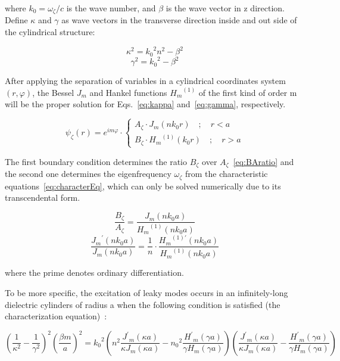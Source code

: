 where $k_0=\omega_\zeta/c$ is the wave number, and $\beta$ is the wave vector
in z direction. Define $\kappa$ and $\gamma$ as wave vectors in the transverse
direction inside and out side of the cylindrical structure:

\begin{equation}
  \kappa^2={k_0}^2n^2-\beta^2
  \label{eq:kappa}
\end{equation}
\begin{equation}
  \gamma^2={k_0}^2-\beta^2
  \label{eq:gamma}
\end{equation}

After applying the separation of variables in a cylindrical coordinates system
$(r,\varphi)$, the Bessel $J_m$ and Hankel functions ${H_m}^{(1)}$ of the first
kind of order m will be the proper solution for Eqs.~\ref{eq:kappa}
and~\ref{eq:gamma}, respectively.

\begin{equation}
  \psi_\zeta(r)=e^{im\varphi}\cdot\left\{
    \begin{array}{ll}
      A_\zeta\cdot{J_m}(nk_0r)\quad;\quad r<a\\
      B_\zeta\cdot{H_m}^{(1)}(k_0r)\quad;\quad r>a
    \end{array}
    \right.
\end{equation}

The first boundary condition determines the ratio $B_\zeta$ over
$A_\zeta$~\ref{eq:BAratio} and the second one determines the eigenfrequency
$\omega_\zeta$ from the characteristic equations~\ref{eq:characterEq}, which
can only be solved numerically due to its transcendental form.

\begin{equation}
  \frac{B_\zeta}{A_\zeta}=\frac{J_m(nk_0a)}{{H_m}^{(1)}(nk_0a)}
  \label{eq:BAratio}
\end{equation}
\begin{equation}
  \frac{{J_m}^\prime(nk_0a)}{{J_m}(nk_0a)}=\frac{1}{n}\cdot\frac{{H_m}^{(1)\prime}(nk_0a)}{{H_m}^{(1)}(nk_0a)}
  \label{eq:characterEq}
\end{equation}

where the prime denotes ordinary differentiation.

To be more specific, the excitation of leaky modes occurs in an infinitely-long
dielectric cylinders of radius a when the following condition is satisfied (the
characterization equation)~\cite{Cao:2009ho}:

\begin{equation}
  {(\frac{1}{\kappa^2}-\frac{1}{\gamma^2})}^2{(\frac{\beta{m}}{a})}^2={k_0}^2(n^2\frac{{J^\prime}_m(\kappa{a})}{\kappa{J_m}(\kappa{a})}-{n_0}^2\frac{{H^\prime}_m(\gamma{a})}{\gamma{H_m}(\gamma{a})})(\frac{{J^\prime}_m(\kappa{a})}{\kappa{J_m}(\kappa{a})}-\frac{{H^\prime}_m(\gamma{a})}{\gamma{H_m}(\gamma{a})})
  \label{eq:LMcharacter}
\end{equation}

